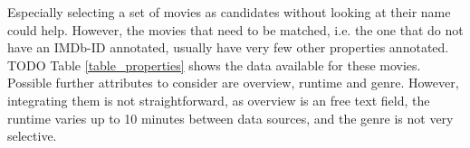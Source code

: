 Especially selecting a set of movies as candidates without looking at their name could help.
However, the movies that need to be matched, i.e. the one that do not have an IMDb-ID annotated, usually have very few other properties annotated.
TODO
Table \ref{table_properties} shows the data available for these movies.
Possible further attributes to consider are overview, runtime and genre.
However, integrating them is not straightforward, as overview is an free text field, the runtime varies up to 10 minutes between data sources, and the genre is not very selective.

